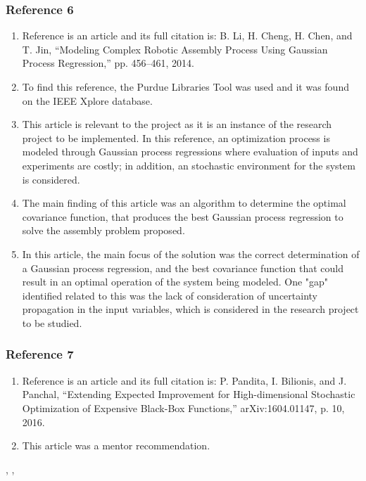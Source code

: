 \documentclass{journal}
\begin{document}
\subsubsection{Reference 6} 
\begin{enumerate}
	\item Reference \cite{Li2014} is an article and its full citation is: B. Li, H. Cheng, H. Chen, and T. Jin, “Modeling Complex Robotic Assembly Process Using Gaussian Process Regression,” pp. 456–461, 2014.
	\item To find this reference, the Purdue Libraries Tool was used and it was found on the IEEE Xplore database.
	\item This article is relevant to the project as it is an instance of the research project to be implemented. In this reference, an optimization process is modeled through Gaussian process regressions where evaluation of inputs and experiments are costly; in addition, an stochastic environment for the system is considered.
	\item The main finding of this article was an algorithm to determine the optimal covariance function, that produces the best Gaussian process regression to solve the assembly problem proposed.  
	\item In this article, the main focus of the solution was the correct determination of a Gaussian process regression, and the best covariance function that could result in an optimal operation of the system being modeled. One "gap" identified related to this was the lack of consideration of uncertainty propagation in the input variables, which is considered in the research project to be studied.
\end{enumerate}

\subsubsection{Reference 7}
\begin{enumerate}
	\item Reference \cite{Pandita2016} is an article and its full citation is: P. Pandita, I. Bilionis, and J. Panchal, “Extending Expected Improvement for High-dimensional Stochastic Optimization of Expensive Black-Box Functions,” arXiv:1604.01147, p. 10, 2016.
	\item This article was a mentor recommendation.
\end{enumerate}




\cite{Costa2006}, \cite{Guo2007}, \cite{Huang2006}
\end{document}
